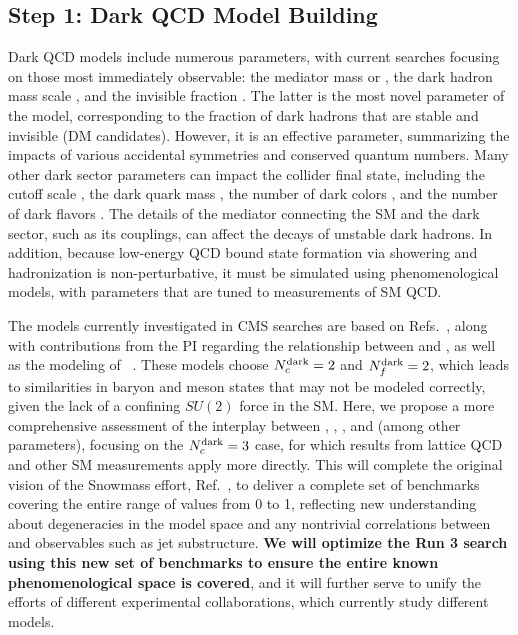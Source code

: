 \subsection{Step 1: Dark QCD Model Building}\label{subsec:models}

Dark QCD models include numerous parameters, with current searches focusing on those most immediately observable:
the mediator mass \mZprime or \mbifun, the dark hadron mass scale \mdark, and the invisible fraction \rinv.
The latter is the most novel parameter of the model, corresponding to the fraction of dark hadrons that are stable and invisible (DM candidates).
However, it is an effective parameter, summarizing the impacts of various accidental symmetries and conserved quantum numbers.
Many other dark sector parameters can impact the collider final state, including the cutoff scale \Lamdark, the dark quark mass \mqdark, the number of dark colors \Ncdark, and the number of dark flavors \Nfdark.
The details of the mediator connecting the SM and the dark sector, such as its couplings, can affect the decays of unstable dark hadrons.
In addition, because low-energy QCD bound state formation via showering and hadronization is non-perturbative, it must be simulated using phenomenological models,
with parameters that are tuned to measurements of SM QCD.

The models currently investigated in CMS searches are based on Refs.~\cite{Cohen:2015toa,Cohen:2017pzm}, along with contributions from the PI
regarding the relationship between \mdark and \Lamdark, as well as the modeling of \rinv~\cite{Albouy:2022cin}.
These models choose $N_{c}^{\text{dark}}=2$ and $N_{f}^{\text{dark}}=2$, which leads to similarities in baryon and meson states that may not be modeled correctly,
given the lack of a confining $SU(2)$ force in the SM.
Here, we propose a more comprehensive assessment of the interplay between \Nfdark, \Lamdark, \mdark, and \mqdark (among other parameters),
focusing on the $N_{c}^{\text{dark}}=3$ case, for which results from lattice QCD and other SM measurements apply more directly.
This will complete the original vision of the Snowmass effort, Ref.~\cite{Albouy:2022cin},
to deliver a complete set of benchmarks covering the entire range of \rinv values from 0 to 1,
reflecting new understanding about degeneracies in the model space and any nontrivial correlations between \rinv and observables such as jet substructure.
\textbf{We will optimize the Run 3 search using this new set of benchmarks to ensure the entire known phenomenological space is covered},
and it will further serve to unify the efforts of different experimental collaborations, which currently study different models.

